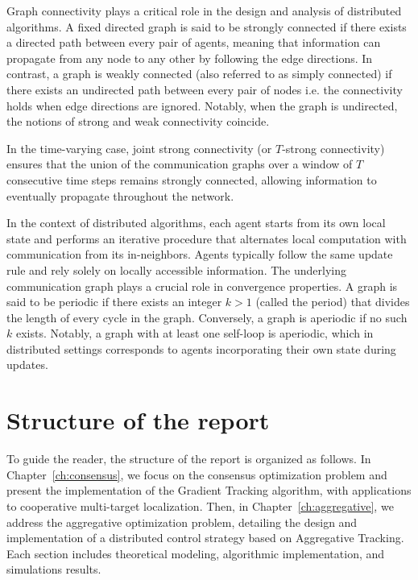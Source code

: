 \vspace{0.5em}

Graph connectivity plays a critical role in the design and analysis of distributed algorithms. A fixed directed graph is said to be strongly connected if there exists a directed path between every pair of agents, meaning that information can propagate from any node to any other by following the edge directions. In contrast, a graph is weakly connected (also referred to as simply connected) if there exists an undirected path between every pair of nodes i.e. the connectivity holds when edge directions are ignored. Notably, when the graph is undirected, the notions of strong and weak connectivity coincide.

In the time-varying case, joint strong connectivity (or $T$-strong connectivity) ensures that the union of the communication graphs over a window of $T$ consecutive time steps remains strongly connected, allowing information to eventually propagate throughout the network.

\vspace{0.5em}

In the context of distributed algorithms, each agent starts from its own local state and performs an iterative procedure that alternates local computation with communication from its in-neighbors. Agents typically follow the same update rule and rely solely on locally accessible information. The underlying communication graph plays a crucial role in convergence properties. A graph is said to be periodic if there exists an integer $k > 1$ (called the period) that divides the length of every cycle in the graph. Conversely, a graph is aperiodic if no such $k$ exists. Notably, a graph with at least one self-loop is aperiodic, which in distributed settings corresponds to agents incorporating their own state during updates. 



\section*{Structure of the report}
To guide the reader, the structure of the report is organized as follows. In Chapter~\ref{ch:consensus}, we focus on the consensus optimization problem and present the implementation of the Gradient Tracking algorithm, with applications to cooperative multi-target localization. Then, in Chapter~\ref{ch:aggregative}, we address the aggregative optimization problem, detailing the design and implementation of a distributed control strategy based on Aggregative Tracking. Each section includes theoretical modeling, algorithmic implementation, and simulations results.
